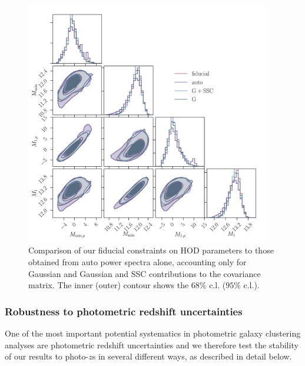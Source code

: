 \documentclass[a4paper,11pt]{article}
\begin{document}
      \begin{figure}
        \begin{center}
          \includegraphics[width=0.95\textwidth]{figures/contours-Mmin-M1_mPk=HOD_fix=alpha-fc-sigmaM_HOD=zevol_fit=pz-shifts-pz-widths+prior=0p2_fit=auto+cross_cosmo=const_HOD-param=zfid_clfit=HOD-zevol_cov=G+NG+SSC-vs-fit=auto-vs-cov=G-vs-cov=G+SSC.pdf}
          \caption{Comparison of our fiducial constraints on HOD parameters to those obtained from auto power spectra alone, accounting only for Gaussian and Gaussian and SSC contributions to the covariance matrix. The inner (outer) contour shows the $68 \%$ c.l. ($95 \%$ c.l.).} \label{fig:constraints-cov=G+NG+SSC-vs-cov=G-vs-cov=G+SSC-vs-fit=auto}
        \end{center}
      \end{figure}

    \subsubsection{Robustness to photometric redshift uncertainties}
      One of the most important potential systematics in photometric galaxy clustering analyses are photometric redshift uncertainties and we therefore test the stability of our results to photo-$z$s in several different ways, as described in detail below. 
     
\end{document}
